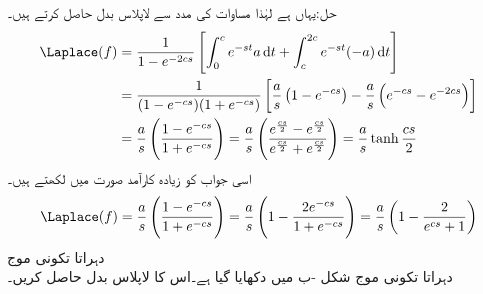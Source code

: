 حل:یہاں  ہے لہٰذا مساوات  کی مدد سے لاپلاس بدل حاصل کرتے ہیں۔
\begin{align*}
\Laplace(f)&=\frac{1}{1-e^{-2cs}}\left[\int_{0}^{c}e^{-st} a\dif t +\int_{c}^{2c}e^{-st}(-a)\dif t\right]\\
&=\frac{1}{(1-e^{-cs})(1+e^{-cs})}\left[\frac{a}{s}\left(1-e^{-cs}\right)-\frac{a}{s}\left(e^{-cs}-e^{-2cs}\right)\right]\\
&=\frac{a}{s}\left(\frac{1-e^{-cs}}{1+e^{-cs}}\right)=\frac{a}{s}\left(\frac{e^{\frac{cs}{2}}-e^{\frac{cs}{2}}}{e^{\frac{cs}{2}}+e^{\frac{cs}{2}}}\right)=\frac{a}{s}\tanh \frac{cs}{2}
\end{align*}
اسی جواب کو زیادہ کارآمد صورت میں لکھتے ہیں۔
\begin{align*}
\Laplace(f)=\frac{a}{s}\left(\frac{1-e^{-cs}}{1+e^{-cs}}\right)=\frac{a}{s}\left(1-\frac{2e^{-cs}}{1+e^{-cs}}\right)=\frac{a}{s}\left(1-\frac{2}{e^{cs}+1}\right)
\end{align*}
\quad دہراتا تکونی موج\\
دہراتا تکونی موج شکل -ب میں دکھایا گیا ہے۔اس کا لاپلاس بدل حاصل کریں۔

